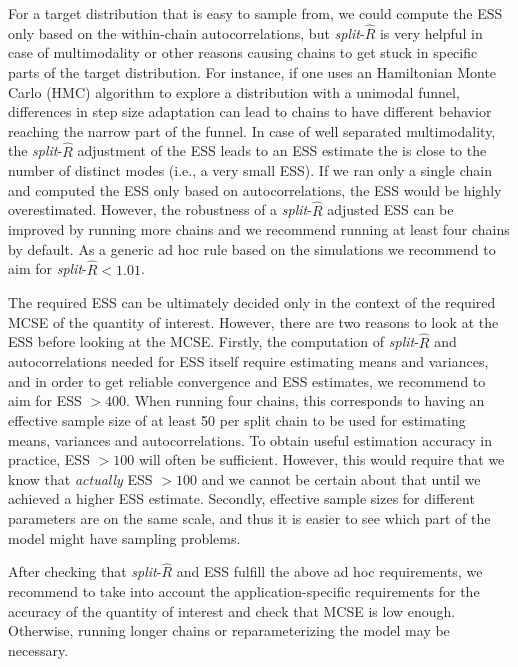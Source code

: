 \documentclass[american,]{article}
\begin{document}
For a target distribution that is easy to sample from, 
we could compute the ESS only based on the within-chain
autocorrelations, but \emph{split}-\(\widehat{R}\) is very helpful in
case of multimodality or other reasons causing chains to get stuck in
specific parts of the target distribution. For instance, if one uses an
Hamiltonian Monte Carlo (HMC) algorithm to explore a distribution with a 
unimodal funnel, differences in step size adaptation can lead to chains to have
different behavior reaching the narrow part of the funnel. In case of
well separated multimodality, the \emph{split}-\(\widehat{R}\)
adjustment of the ESS leads to an ESS estimate the is close to the number of
distinct modes (i.e., a very small ESS). If we ran only a single chain and 
computed the ESS only based on autocorrelations, the ESS would be highly
overestimated. However, the robustness of a \emph{split}-\(\widehat{R}\) adjusted
ESS can be improved by running more chains and we recommend running at
least four chains by default. As a generic ad hoc rule based on the
simulations we recommend to aim for \emph{split}-\(\widehat{R} < 1.01\).

The required ESS can be ultimately decided only in the context of the required
MCSE of the quantity of interest. However, there are two reasons to look at
the ESS before looking at the MCSE. Firstly, the computation of
\emph{split}-\(\widehat{R}\) and autocorrelations needed for ESS
itself require estimating means and variances, and in order to get
reliable convergence and ESS estimates, we recommend to aim for
ESS $>400$. When running four chains, this corresponds to having
an effective sample size of at least 50 per split chain to be used
for estimating means, variances and autocorrelations. To obtain
useful estimation accuracy in practice, ESS $> 100$ will often be sufficient. 
However, this would require that we know that \emph{actually} ESS $ > 100$ and 
we cannot be certain about that until we achieved a higher ESS estimate.
Secondly, effective sample sizes for different parameters are on the
same scale, and thus it is easier to see which part of the model might
have sampling problems.

After checking that \emph{split}-\(\widehat{R}\) and ESS fulfill the
above ad hoc requirements, we recommend to take into account the
application-specific requirements for the accuracy of the quantity of
interest and check that MCSE is low enough. Otherwise, running longer chains
or reparameterizing the model may be necessary.

\end{document}

